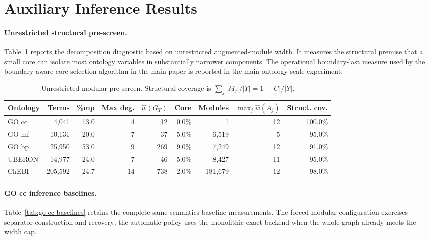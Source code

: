 \documentclass[letterpaper]{article}
\begin{document}
\section{Auxiliary Inference Results}

\paragraph{Unrestricted structural pre-screen.}
Table~\ref{tab:structure-decomposition} reports the decomposition
diagnostic based on unrestricted augmented-module width. It measures the
structural premise that a small core can isolate most ontology variables
in substantially narrower components. The operational boundary-last
measure used by the boundary-aware core-selection algorithm in the main paper is reported in
the main ontology-scale experiment.

\begin{table}[t]
\centering
\small
\setlength{\tabcolsep}{5pt}
\begin{tabular}{lrrrrrrrr}
\toprule
Ontology & Terms & \%mp & Max deg. & \(\widehat w(G_T)\)
& Core & Modules & \(\max_j\widehat w(A_j)\) & Struct. cov. \\
\midrule
GO cc  & 4,041   & 13.0 & 4  & 12  & 0.0\% & 1       & 12 & 100.0\% \\
GO mf  & 10,131  & 20.0 & 7  & 37  & 5.0\% & 6,519   & 5  & 95.0\%  \\
GO bp  & 25,950  & 53.0 & 9  & 269 & 9.0\% & 7,249   & 12 & 91.0\%  \\
UBERON & 14,977  & 24.0 & 7  & 46  & 5.0\% & 8,427   & 11 & 95.0\%  \\
ChEBI  & 205,592 & 24.7 & 14 & 738 & 2.0\% & 181,679 & 12 & 98.0\%  \\
\bottomrule
\end{tabular}
\caption{Unrestricted modular pre-screen. Structural coverage is
\(\sum_j|M_j|/|Y|=1-|C|/|Y|\).}
\label{tab:structure-decomposition}
\end{table}

\paragraph{GO cc inference baselines.}
Table~\ref{tab:go-cc-baselines} retains the complete same-semantics
baseline measurements. The forced modular configuration exercises
separator construction and recovery; the automatic policy uses the
monolithic exact backend when the whole graph already meets the width cap.
\end{document}
